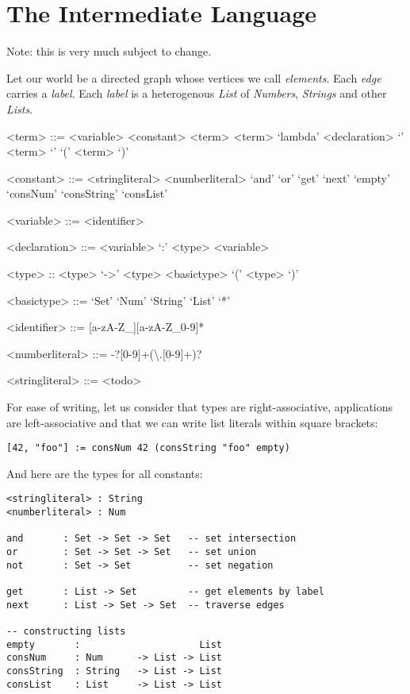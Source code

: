 \documentclass[main.tex]{subfiles}
\begin{document}
\section{The Intermediate Language}
Note: this is very much subject to change.

Let our world be a directed graph whose vertices we call \emph{elements}.
Each \emph{edge} carries a \emph{label}. Each \emph{label} is a heterogenous
\emph{List} of \emph{Numbers}, \emph{Strings} and other \emph{Lists}.

\begin{grammar}

<term> ::= <variable>
\alt <constant>
\alt <term> <term>
\alt `lambda' <declaration> `{' <term> `}'
\alt `(' <term> `)'

<constant> ::= <stringliteral>
          \alt <numberliteral>
          \alt `and'
          \alt `or'
          \alt `get'
          \alt `next'
          \alt `empty'
          \alt `consNum'
          \alt `consString'
          \alt `consList'


<variable> ::= <identifier>

<declaration> ::= <variable> `:' <type>
\alt <variable>

<type> :: <type> `->' <type>
\alt <basictype>
\alt `(' <type> `)'

<basictype> ::= `Set'
\alt `Num'
\alt `String'
\alt `List'
\alt `*'

<identifier> ::= [a-zA-Z_][a-zA-Z_0-9]*

<numberliteral>     ::= -?[0-9]+(\textbackslash.[0-9]+)?

<stringliteral>     ::= <todo>
\end{grammar}

For ease of writing, let us consider that types are right-associative,
applications are left-associative and that we can write list literals
within square brackets:
\begin{lstlisting}
[42, "foo"] := consNum 42 (consString "foo" empty)
\end{lstlisting}

And here are the types for all constants:

\begin{lstlisting}
<stringliteral> : String
<numberliteral> : Num

and       : Set -> Set -> Set   -- set intersection
or        : Set -> Set -> Set   -- set union
not       : Set -> Set          -- set negation

get       : List -> Set         -- get elements by label
next      : List -> Set -> Set  -- traverse edges

-- constructing lists
empty       :                     List
consNum     : Num      -> List -> List
consString  : String   -> List -> List
consList    : List     -> List -> List

\end{lstlisting}
\end{document}
